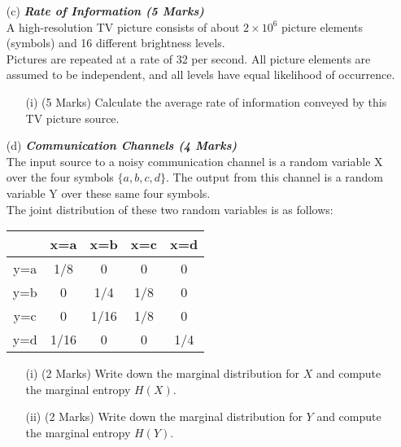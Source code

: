 \documentclass[a4paper,12pt]{article}
\begin{document}
\newpage
\begin{itemize}
\item[(c)] \textbf{\textit{Rate of Information (5 Marks)}}\\
A high-resolution TV picture consists of about $2 \times 10^6$ picture elements (symbols) and 16
different brightness levels.\\
\newline
Pictures are repeated at a rate of 32 per second. All picture elements
are assumed to be independent, and all levels have equal likelihood of occurrence. 
\begin{itemize}
\item[(i)](5 Marks) Calculate the
average rate of information conveyed by this TV picture source.
\end{itemize}


\item[(d)] \textbf{\textit{Communication Channels (4 Marks)}}\\
The input source to a noisy communication channel is a random variable X over the
four symbols $\{a, b, c, d\}$. The output from this channel is a random variable Y over these same
four symbols. \\
\vspace{0.3cm}
\noindent 
The joint distribution of these two random variables is as follows:\\ \bigskip

\begin{center}
\begin{tabular}{|c|c|c|c|c|}
\hline
&x=a& x=b & x=c & x=d \\ \hline
y=a &1/8 &0 &0 & 0 \\ \hline
y=b &0 & 1/4& 1/8& 0 \\ \hline
y=c & 0&1/16 & 1/8 & 0\\ \hline
y=d & 1/16& 0& 0 & 1/4\\ \hline
\end{tabular}
\end{center}

\begin{itemize}
\item[(i)] (2 Marks) Write down the marginal distribution for $X$ and compute the marginal entropy $H(X)$.
\item[(ii)] (2 Marks) Write down the marginal distribution for $Y$ and compute the marginal entropy $H(Y )$.
\end{itemize}

\end{itemize}
\newpage
\end{document}
